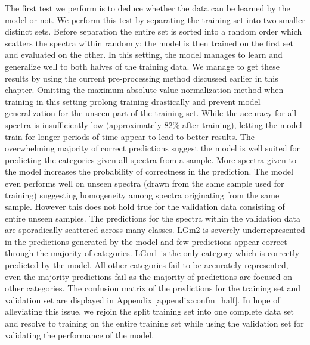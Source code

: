 The first test we perform is to deduce whether the data can be learned by the model or not. We perform this test by separating the training set into two smaller distinct sets. Before separation the entire set is sorted into a random order which scatters the spectra within randomly; the model is then trained on the first set and evaluated on the other. In this setting, the model manages to learn and generalize well to both halves of the training data. We manage to get these results by using the current pre-processing method discussed earlier in this chapter. Omitting the maximum absolute value normalization method when training in this setting prolong training drastically and prevent model generalization for the unseen part of the training set. While the accuracy for all spectra is insufficiently low (approximately $82\%$ after training), letting the model train for longer periods of time appear to lead to better results. The overwhelming majority of correct predictions suggest the model is well suited for predicting the categories given all spectra from a sample. More spectra given to the model increases the probability of correctness in the prediction. The model even performs well on unseen spectra (drawn from the same sample used for training) suggesting homogeneity among spectra originating from the same sample. However this does not hold true for the validation data consisting of entire unseen samples. The predictions for the spectra within the validation data are sporadically scattered across many classes. LGm2 is severely underrepresented in the predictions generated by the model and few predictions appear correct through the majority of categories. LGm1 is the only category which is correctly predicted by the model. All other categories fail to be accurately represented, even the majority predictions fail as the majority of predictions are focused on other categories. The confusion matrix of the predictions for the training set and validation set are displayed in Appendix \ref{appendix:confm_half}. In hope of alleviating this issue, we rejoin the split training set into one complete data set and resolve to training on the entire training set while using the validation set for validating the performance of the model.

